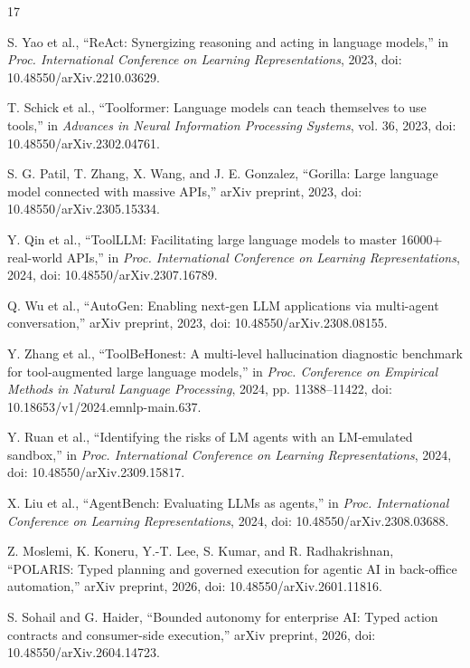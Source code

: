 \begin{thebibliography}{17}

 S. Yao et al., ``ReAct: Synergizing reasoning and acting in language models,'' in \emph{Proc. International Conference on Learning Representations}, 2023, doi: 10.48550/arXiv.2210.03629.

 T. Schick et al., ``Toolformer: Language models can teach themselves to use tools,'' in \emph{Advances in Neural Information Processing Systems}, vol. 36, 2023, doi: 10.48550/arXiv.2302.04761.

 S. G. Patil, T. Zhang, X. Wang, and J. E. Gonzalez, ``Gorilla: Large language model connected with massive APIs,'' arXiv preprint, 2023, doi: 10.48550/arXiv.2305.15334.

 Y. Qin et al., ``ToolLLM: Facilitating large language models to master 16000+ real-world APIs,'' in \emph{Proc. International Conference on Learning Representations}, 2024, doi: 10.48550/arXiv.2307.16789.

 Q. Wu et al., ``AutoGen: Enabling next-gen LLM applications via multi-agent conversation,'' arXiv preprint, 2023, doi: 10.48550/arXiv.2308.08155.

 Y. Zhang et al., ``ToolBeHonest: A multi-level hallucination diagnostic benchmark for tool-augmented large language models,'' in \emph{Proc. Conference on Empirical Methods in Natural Language Processing}, 2024, pp. 11388--11422, doi: 10.18653/v1/2024.emnlp-main.637.

 Y. Ruan et al., ``Identifying the risks of LM agents with an LM-emulated sandbox,'' in \emph{Proc. International Conference on Learning Representations}, 2024, doi: 10.48550/arXiv.2309.15817.

 X. Liu et al., ``AgentBench: Evaluating LLMs as agents,'' in \emph{Proc. International Conference on Learning Representations}, 2024, doi: 10.48550/arXiv.2308.03688.

 Z. Moslemi, K. Koneru, Y.-T. Lee, S. Kumar, and R. Radhakrishnan, ``POLARIS: Typed planning and governed execution for agentic AI in back-office automation,'' arXiv preprint, 2026, doi: 10.48550/arXiv.2601.11816.

 S. Sohail and G. Haider, ``Bounded autonomy for enterprise AI: Typed action contracts and consumer-side execution,'' arXiv preprint, 2026, doi: 10.48550/arXiv.2604.14723.


\end{thebibliography}
